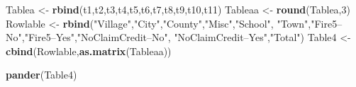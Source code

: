 \documentclass[]{book}
\newenvironment{Shaded}{\begin{snugshade}}{\end{snugshade}}
\newcommand{\KeywordTok}[1]{\textcolor[rgb]{0.13,0.29,0.53}{\textbf{#1}}}
\newcommand{\DecValTok}[1]{\textcolor[rgb]{0.00,0.00,0.81}{#1}}
\newcommand{\StringTok}[1]{\textcolor[rgb]{0.31,0.60,0.02}{#1}}
\newcommand{\NormalTok}[1]{#1}
\theoremstyle{definition}
\theoremstyle{definition}
\theoremstyle{definition}
\theoremstyle{remark}
\begin{document}
\begin{Shaded}
\begin{Highlighting}[]
\NormalTok{Tablea <-}\StringTok{ }\KeywordTok{rbind}\NormalTok{(t1,t2,t3,t4,t5,t6,t7,t8,t9,t10,t11)}
\NormalTok{Tableaa <-}\StringTok{ }\KeywordTok{round}\NormalTok{(Tablea,}\DecValTok{3}\NormalTok{)}
\NormalTok{Rowlable <-}\StringTok{ }\KeywordTok{rbind}\NormalTok{(}\StringTok{"Village"}\NormalTok{,}\StringTok{"City"}\NormalTok{,}\StringTok{"County"}\NormalTok{,}\StringTok{"Misc"}\NormalTok{,}\StringTok{"School"}\NormalTok{,}
                  \StringTok{"Town"}\NormalTok{,}\StringTok{"Fire5--No"}\NormalTok{,}\StringTok{"Fire5--Yes"}\NormalTok{,}\StringTok{"NoClaimCredit--No"}\NormalTok{,}
                  \StringTok{"NoClaimCredit--Yes"}\NormalTok{,}\StringTok{"Total"}\NormalTok{)}
\NormalTok{Table4 <-}\StringTok{ }\KeywordTok{cbind}\NormalTok{(Rowlable,}\KeywordTok{as.matrix}\NormalTok{(Tableaa))}
\end{Highlighting}
\end{Shaded}

\begin{Shaded}
\begin{Highlighting}[]
\KeywordTok{pander}\NormalTok{(Table4)}
\end{Highlighting}
\end{Shaded}
\end{document}
